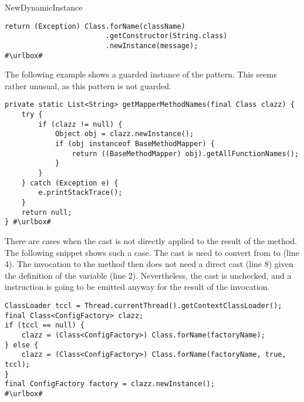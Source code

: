 \begin{pattern}{NewDynamicInstance}
\begin{verbatim}
return (Exception) Class.forName(className)
                        .getConstructor(String.class)
                        .newInstance(message);
#\urlbox#
\end{verbatim}

The following example%
\def\urlvar{http://bit.ly/alibaba_LuaViewSDK_2HC33xg}
shows a guarded instance of the \thisp{} pattern.
This seems rather unusual, as this pattern is not guarded.

\begin{verbatim}
private static List<String> getMapperMethodNames(final Class clazz) {
    try {
        if (clazz != null) {
            Object obj = clazz.newInstance();
            if (obj instanceof BaseMethodMapper) {
                return ((BaseMethodMapper) obj).getAllFunctionNames();
            }
        }
    } catch (Exception e) {
        e.printStackTrace();
    }
    return null;
} #\urlbox#
\end{verbatim}

There are cases when the cast is not directly applied to the result of the  method.
The following snippet shows such a case.%
\def\urlvar{http://bit.ly/pac4j_pac4j_2HJtXUn}
The cast is used to convert from  to  (line 4).
The invocation to the  method then does not need a direct cast (line 8) given the definition of the  variable (line 2).
Nevertheless, the cast is unchecked, and a  instruction is going to be emitted anyway for the result of the  invocation.

\begin{verbatim}
ClassLoader tccl = Thread.currentThread().getContextClassLoader();
final Class<ConfigFactory> clazz;
if (tccl == null) {
    clazz = (Class<ConfigFactory>) Class.forName(factoryName);
} else {
    clazz = (Class<ConfigFactory>) Class.forName(factoryName, true, tccl);
}
final ConfigFactory factory = clazz.newInstance();
#\urlbox#
\end{verbatim}




\end{pattern}
